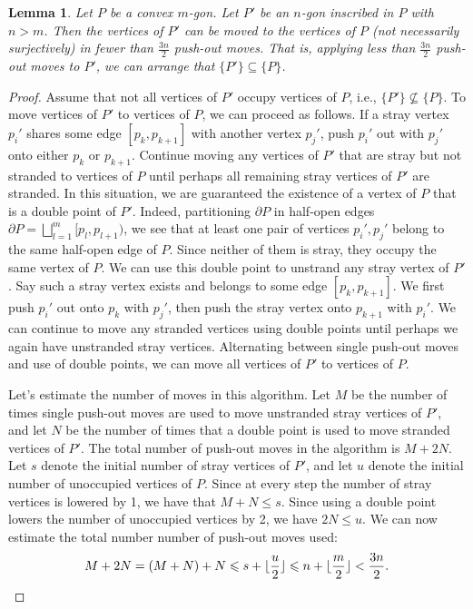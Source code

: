 \documentclass[11pt]{amsart}
\newtheorem{lemma}[theorem]{Lemma}
\theoremstyle{remark}
\numberwithin{equation}{section}
\renewcommand{\leq}{\leqslant}
\begin{document}
\begin{lemma}\label{fromP'toQ}
Let $P$ be a convex $m$-gon. Let $P'$ be an $n$-gon inscribed in $P$ with $n>m$. Then the vertices of $P'$ can be moved to the vertices of $P$ 
(not necessarily surjectively) in fewer than $\frac{3n}{2}$ push-out moves. That is, applying less than  $\frac{3n}{2}$ push-out moves to $P'$,
we can arrange that $\{P'\}\subseteq \{P\}$.
\end{lemma}


\begin{proof}
Assume that not all vertices of $P'$ occupy vertices of $P$, i.e., $\{P'\}\not\subseteq \{P\}$. To move vertices of $P'$ to vertices of $P$, we can proceed as follows. If a  stray vertex $p_i'$  shares some edge $[p_k,p_{k+1}]$ with another vertex $p_j'$, push $p_i'$ out with $p_j'$ onto either $p_k$ or $p_{k+1}$.
Continue moving any vertices of $P'$ that are stray but not stranded to vertices of $P$  until perhaps all remaining stray vertices of $P'$ are  stranded. In this situation, we are guaranteed the existence of a  vertex of $P$ that is a double point of $P'$.
Indeed, partitioning  $\partial P$ in half-open edges $\partial P= \bigsqcup_{l=1}^{m} [p_l,p_{l+1})$, we see that  at least one pair of vertices $p_i',p_j'$ belong to the same  half-open edge of $P$.  Since neither of them is stray, they occupy the same vertex of $P$.
We can use this double point to unstrand any stray vertex of $P'$. Say such a stray vertex exists and belongs to  some edge $[p_k,p_{k+1}]$. We first push $p_i'$ out onto $p_k$ with $p_j'$, then push the stray vertex onto $p_{k+1}$ with $p_i'$.  We can continue to move any stranded vertices using double points until perhaps we again have unstranded stray vertices. Alternating between single push-out moves and use of double points, we can move all vertices of  $P'$ to vertices of $P$.

Let's estimate the number of moves in this algorithm.
Let $M$ be the number of times single push-out moves are used to move unstranded stray vertices of $P'$, and let  $N$ be the number of times that a double point is used to move stranded  vertices of $P'$. The total number of push-out moves in the algorithm is $M+2N$.
 Let $s$ denote the initial number of stray vertices of $P'$, and let $u$ denote the initial number of unoccupied vertices of $P$.  Since at every step the number of stray vertices is lowered by 1, we have that $M+N\leq s$.  Since using a double point lowers the number of unoccupied vertices by 2, we have $2N\leq u$. We can now  estimate the total number number of push-out moves used:
\[
M+2N = (M+N)+N\leq s+ \lfloor \frac{u}{2}\rfloor\leq n+\lfloor \frac{m}{2}\rfloor<\frac{3n}{2}.\qedhere
\]
\end{proof}
\end{document}

